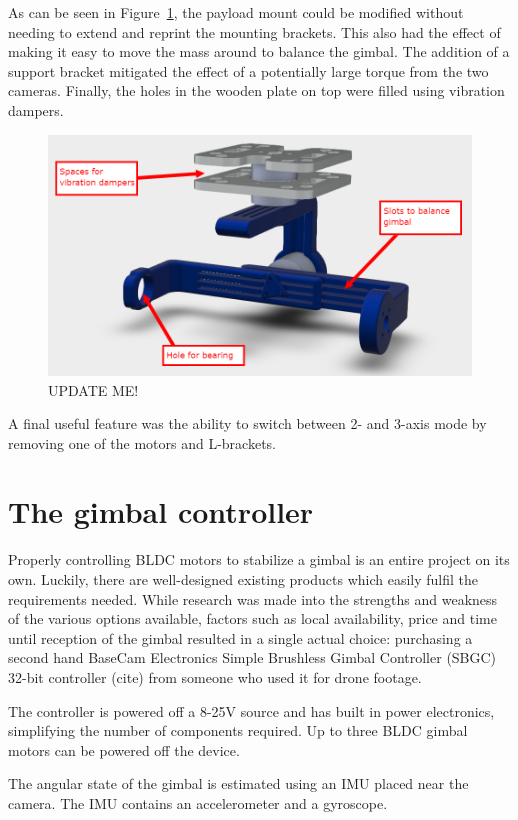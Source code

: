 As can be seen in Figure~\ref{fig:annotated_assembly_no_cams}, the payload mount could be modified without needing to extend and reprint the mounting brackets. This also had the effect of making it easy to move the mass around to balance the gimbal. The addition of a support bracket mitigated the effect of a potentially large torque from the two cameras. Finally, the holes in the wooden plate on top were filled using vibration dampers.

\begin{figure}[h!]
    \centering
    \includegraphics[width=0.7\linewidth]{methodology/annotated_assembly_no_cams}
    \caption{\label{fig:annotated_assembly_no_cams}UPDATE ME!}
\end{figure}

A final useful feature was the ability to switch between 2- and 3-axis mode by removing one of the motors and L-brackets.


\section{The gimbal controller}
Properly controlling BLDC motors to stabilize a gimbal is an entire project on its own. Luckily, there are well-designed existing products which easily fulfil the requirements needed. While research was made into the strengths and weakness of the various options available, factors such as local availability, price and time until reception of the gimbal resulted in a single actual choice: purchasing a second hand BaseCam Electronics Simple Brushless Gimbal Controller (SBGC) 32-bit controller {\color{red} (cite)} from someone who used it for drone footage.

The controller is powered off a 8-25V source and has built in power electronics, simplifying the number of components required. Up to three BLDC gimbal motors can be powered off the device.

The angular state of the gimbal is estimated using an IMU placed near the camera. The IMU contains an accelerometer and a gyroscope.


